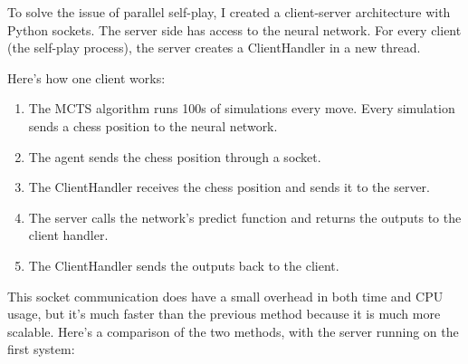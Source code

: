 \documentclass{article}
\begin{document}
To solve the issue of parallel self-play, I created a client-server architecture with Python sockets.
The server side has access to the neural network. For every client (the self-play process), 
the server creates a ClientHandler in a new thread.

Here's how one client works:

\begin{enumerate}
    \item The MCTS algorithm runs 100s of simulations every move. Every simulation sends a chess position to the neural network.
    \item The agent sends the chess position through a socket.
    \item The ClientHandler receives the chess position and sends it to the server.
    \item The server calls the network's predict function and returns the outputs to the client handler.
    \item The ClientHandler sends the outputs back to the client.
\end{enumerate}

This socket communication does have a small overhead in both time and CPU usage, but it's much faster than the previous method
because it is much more scalable. Here's a comparison of the two methods, with the server running on the first system:

\begin{table}[H]
\caption{Comparison of multiprocessing and non-multiprocessing self-play}
\end{table}
\end{document}
